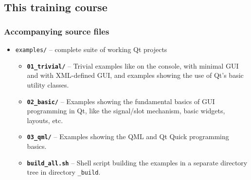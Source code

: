 \subsection{This training course}

\begin{frame}
  \frametitle{Accompanying source files}
  \begin{itemize}
  \item \texttt{examples/} -- complete suite of working Qt projects
    \begin{itemize}
    \item \textbf{\texttt{01\_trivial/}} -- Trivial examples like
	     on the
	    console, with minimal GUI and with XML-defined GUI, and
	    examples showing the use of Qt's basic utility classes.
    \item \textbf{\texttt{02\_basic/}} -- Examples showing the fundamental
	    basics of GUI programming in Qt, like the signal/slot mechanism,
	    basic widgets, layouts, etc.
    \item \textbf{\texttt{03\_qml/}} -- Examples showing the QML and Qt Quick
	    programming basics.
    \item \textbf{\texttt{build\_all.sh}} -- Shell script building the examples
	    in a separate directory tree in directory \texttt{\_build}.

    \end{itemize}
  \end{itemize}
\end{frame}

